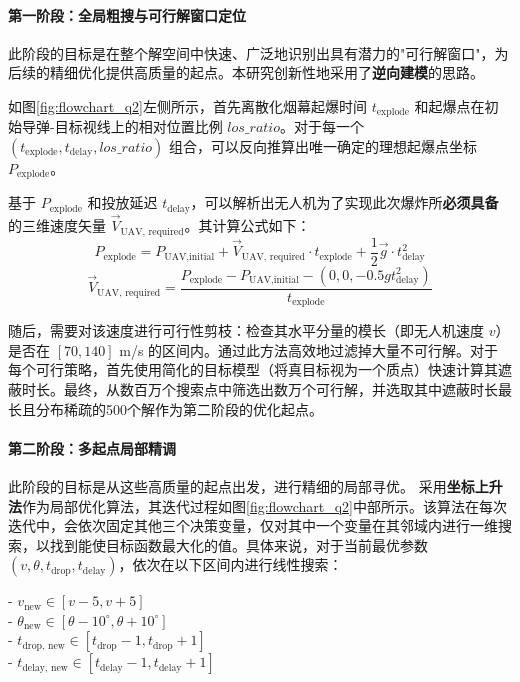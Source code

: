 \documentclass[12pt]{article}
\begin{document}
\begin{CJK}{UTF8}{gbsn}
		\paragraph{第一阶段：全局粗搜与可行解窗口定位}
		此阶段的目标是在整个解空间中快速、广泛地识别出具有潜力的"可行解窗口"，为后续的精细优化提供高质量的起点。本研究创新性地采用了\textbf{逆向建模}的思路。
		
		如图\ref{fig:flowchart_q2}左侧所示，首先离散化烟幕起爆时间 $t_{\text{explode}}$ 和起爆点在初始导弹-目标视线上的相对位置比例 $los\_ratio$。对于每一个 $(t_{\text{explode}}, t_{\text{delay}}, los\_ratio)$ 组合，可以反向推算出唯一确定的理想起爆点坐标 $P_{\text{explode}}$。
		
		基于 $P_{\text{explode}}$ 和投放延迟 $t_{\text{delay}}$，可以解析出无人机为了实现此次爆炸所\textbf{必须具备}的三维速度矢量 $\vec{V}_{\text{UAV, required}}$。其计算公式如下：
		\begin{equation}
			P_{\text{explode}} = P_{\text{UAV,initial}} + \vec{V}_{\text{UAV, required}} \cdot t_{\text{explode}} + \frac{1}{2} \vec{g} \cdot t_{\text{delay}}^2
		\end{equation}
		\begin{equation}
			\vec{V}_{\text{UAV, required}} = \frac{P_{\text{explode}} - P_{\text{UAV,initial}} - (0, 0, -0.5gt_{\text{delay}}^2)}{t_{\text{explode}}}
		\end{equation}
		
		随后，需要对该速度进行可行性剪枝：检查其水平分量的模长（即无人机速度 $v$）是否在 $[70, 140]$ m/s 的区间内。通过此方法高效地过滤掉大量不可行解。对于每个可行策略，首先使用简化的目标模型（将真目标视为一个质点）快速计算其遮蔽时长。最终，从数百万个搜索点中筛选出数万个可行解，并选取其中遮蔽时长最长且分布稀疏的500个解作为第二阶段的优化起点。
		
		\paragraph{第二阶段：多起点局部精调}
		此阶段的目标是从这些高质量的起点出发，进行精细的局部寻优。
		采用\textbf{坐标上升法}作为局部优化算法，其迭代过程如图\ref{fig:flowchart_q2}中部所示。该算法在每次迭代中，会依次固定其他三个决策变量，仅对其中一个变量在其邻域内进行一维搜索，以找到能使目标函数最大化的值。具体来说，对于当前最优参数 $(v, \theta, t_{\text{drop}}, t_{\text{delay}})$，依次在以下区间内进行线性搜索：
		
		- $v_{\text{new}} \in [v-5, v+5]$\\
		\indent	- $\theta_{\text{new}} \in [\theta-10^\circ, \theta+10^\circ]$\\
		\indent	- $t_{\text{drop, new}} \in [t_{\text{drop}}-1, t_{\text{drop}}+1]$\\
		\indent	- $t_{\text{delay, new}} \in [t_{\text{delay}}-1, t_{\text{delay}}+1]$
		

\end{CJK}
\end{document}
